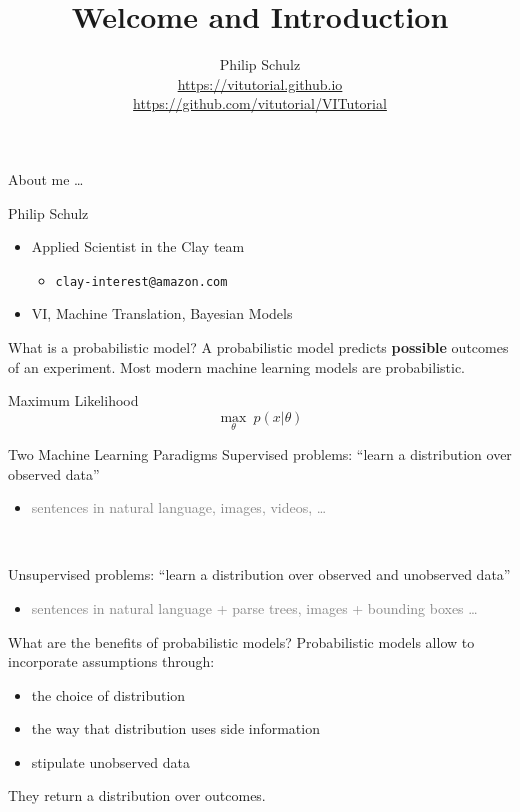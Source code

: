 \documentclass[14pt, aspectratio=169]{beamer}\usepackage[]{graphicx}\usepackage[]{color}
\title{Welcome and Introduction}
\date{}
\author{Philip Schulz \\
\url{https://vitutorial.github.io} \\
\url{https://github.com/vitutorial/VITutorial}}
\begin{document}
\frame{\titlepage}

\begin{frame}{About me \ldots}

\begin{block}{Philip Schulz}
\begin{itemize}
\item Applied Scientist in the Clay team
\begin{itemize}
\item \texttt{clay-interest@amazon.com}
\end{itemize}
\item VI, Machine Translation, Bayesian Models
\end{itemize}
\end{block}
\end{frame}

\begin{frame}{What is a probabilistic model?}
A probabilistic model predicts \textbf{possible} outcomes of an experiment.
Most modern machine learning models are probabilistic.
\pause
\begin{block}{Maximum Likelihood}
\begin{equation*}
\underset{\theta}{\max}~p(x|\theta)
\end{equation*}
\end{block}
\end{frame}

\begin{frame}{Two Machine Learning Paradigms}
Supervised problems: \alert{``learn a distribution over observed data''}
\begin{itemize}
	\item \textcolor{gray}{sentences in natural language, images, videos, \ldots}
\end{itemize}

~

Unsupervised problems: \alert{``learn a distribution over observed and unobserved data''}
\begin{itemize}
	\item \textcolor{gray}{sentences in natural language + parse trees, images + bounding boxes \ldots}
\end{itemize}


\end{frame}

\begin{frame}{What are the benefits of probabilistic models?}
Probabilistic models allow to incorporate assumptions through:
\begin{itemize}
\item the choice of distribution
\item the way that distribution uses side information
\item stipulate unobserved data
\end{itemize}
\pause
They return a distribution over outcomes.
\end{frame}
\end{document}
